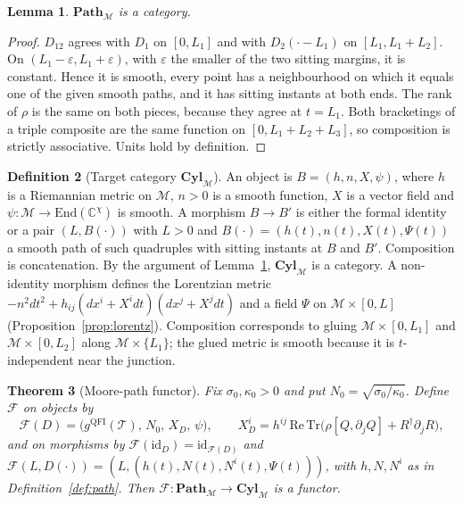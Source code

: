 \documentclass[11pt,a4paper,reqno]{amsart}
\newtheorem{theorem}{Theorem}[section]
\newtheorem{lemma}[theorem]{Lemma}
\theoremstyle{definition}
\newtheorem{definition}[theorem]{Definition}
\numberwithin{equation}{section}
\newcommand{\C}{\mathbb{C}}
\newcommand{\Tr}{\mathrm{Tr}}
\newcommand{\End}{\mathrm{End}}
\newcommand{\QFI}{\mathrm{QFI}}
\newcommand{\Path}{\mathbf{Path}_{\mathcal{M}}}
\newcommand{\Cyl}{\mathbf{Cyl}_{\mathcal{M}}}
\begin{document}
\begin{lemma}\label{lem:category}
$\Path$ is a category.
\end{lemma}

\begin{proof}
$D_{12}$ agrees with $D_1$ on $[0,L_1]$ and with $D_2(\cdot-L_1)$ on $[L_1,L_1+L_2]$. On $(L_1-\varepsilon,L_1+\varepsilon)$, with $\varepsilon$ the smaller of the two sitting margins, it is constant. Hence it is smooth, every point has a neighbourhood on which it equals one of the given smooth paths, and it has sitting instants at both ends. The rank of $\rho$ is the same on both pieces, because they agree at $t=L_1$. Both bracketings of a triple composite are the same function on $[0,L_1+L_2+L_3]$, so composition is strictly associative. Units hold by definition.
\end{proof}

\begin{definition}[Target category $\Cyl$]\label{def:cyl}
An object is $B=(h,n,X,\psi)$, where $h$ is a Riemannian metric on $\mathcal{M}$, $n>0$ is a smooth function, $X$ is a vector field and $\psi:\mathcal{M}\to\End(\C^\chi)$ is smooth. A morphism $B\to B'$ is either the formal identity or a pair $(L,B(\cdot))$ with $L>0$ and $B(\cdot)=(h(t),n(t),X(t),\Psi(t))$ a smooth path of such quadruples with sitting instants at $B$ and $B'$. Composition is concatenation. By the argument of Lemma~\ref{lem:category}, $\Cyl$ is a category. A non-identity morphism defines the Lorentzian metric $-n^2dt^2+h_{ij}(dx^i+X^idt)(dx^j+X^jdt)$ and a field $\Psi$ on $\mathcal{M}\times[0,L]$ (Proposition~\ref{prop:lorentz}). Composition corresponds to gluing $\mathcal{M}\times[0,L_1]$ and $\mathcal{M}\times[0,L_2]$ along $\mathcal{M}\times\{L_1\}$; the glued metric is smooth because it is $t$-independent near the junction.
\end{definition}

\begin{theorem}[Moore-path functor]\label{thm:functor}
Fix $\sigma_0,\kappa_0>0$ and put $N_0=\sqrt{\sigma_0/\kappa_0}$. Define $\mathcal{F}$ on objects by
\[
\mathcal{F}(D)=\big(g^{\QFI}(\mathcal{T}),\,N_0,\,X_D,\,\psi\big),\qquad X_D^i=h^{ij}\,\mathrm{Re}\,\Tr\big(\rho[Q,\partial_jQ]+R^\dagger\partial_jR\big),
\]
and on morphisms by $\mathcal{F}(\mathrm{id}_D)=\mathrm{id}_{\mathcal{F}(D)}$ and $\mathcal{F}(L,D(\cdot))=(L,(h(t),N(t),N^i(t),\Psi(t)))$, with $h,N,N^i$ as in Definition~\ref{def:path}. Then $\mathcal{F}:\Path\to\Cyl$ is a functor.
\end{theorem}
\end{document}

